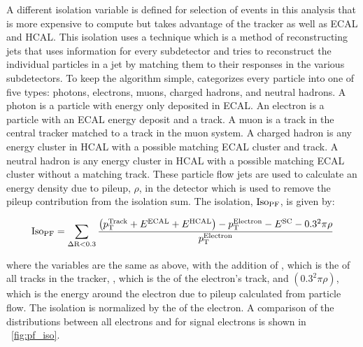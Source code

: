 A different isolation variable is defined for selection of events in this
analysis that is more expensive to compute but takes advantage of the tracker
as well as ECAL and HCAL. This isolation uses a
\particleflow\cite{particle_flow_2010} technique which is a method of
reconstructing jets that uses information for every subdetector and tries to
reconstruct the individual particles in a jet by matching them to their
responses in the various subdetectors. To keep the algorithm simple,
\particleflow categorizes every particle into one of five types: photons,
electrons, muons, charged hadrons, and neutral hadrons. A photon is a particle
with energy only deposited in ECAL. An electron is a particle with an ECAL
energy deposit and a track. A muon is a track in the central tracker matched to
a track in the muon system. A charged hadron is any energy cluster in HCAL with
a possible matching ECAL cluster and track. A neutral hadron is any energy cluster in
HCAL with a possible matching ECAL cluster without a matching track. These particle flow
jets are used to calculate an energy density due to pileup, $\rho$, in the
detector which is used to remove the pileup contribution from the isolation
sum. The \particleflow isolation, $\text{Iso}_{\text{PF}}$, is given by:

\begin{equation}
    \text{Iso}_{\text{PF}} = \sum_{\Delta \text{R}<0.3} \frac{\left(p_{\mathrm{T}}^{\text{Track}} + E^{\text{ECAL}} + E^{\text{HCAL}}\right) - p_{\mathrm{T}}^{\text{Electron}}
    - E^{\text{SC}} - 0.3^{2} \pi \rho}{p_{\mathrm{T}}^{\text{Electron}}}
\end{equation}

\noindent where the variables are the same as above, with the addition of \ptTrack, which
is the \pt of all tracks in the tracker, \ptElectron, which is the \pt of the
electron's track, and $\left(0.3^{2} \pi \rho\right)$, which is the energy
around the electron due to pileup calculated from particle flow. The
\particleflow isolation is normalized by the \pt of the electron. A comparison
of the \PFISO distributions between all electrons and for signal electrons is
shown in \FIG~\ref{fig:pf_iso}.

